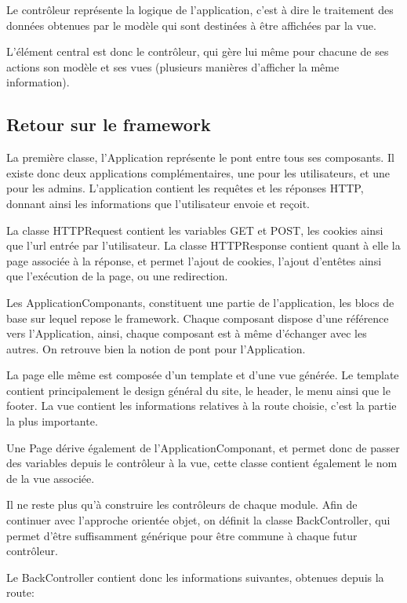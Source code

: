 Le contrôleur représente la logique de l'application, c'est à dire le traitement des données obtenues par le modèle
qui sont destinées à être affichées par la vue.

L'élément central est donc le contrôleur, qui gère lui même pour chacune de ses actions son modèle et ses vues (plusieurs
manières d'afficher la même information).

        \subsection{Retour sur le framework}

La première classe, l'Application représente le pont entre tous ses composants. Il existe donc deux applications complémentaires, une pour les utilisateurs, et une pour les admins.
L'application contient les requêtes et les réponses HTTP, donnant ainsi les informations que l'utilisateur envoie et reçoit.

La classe HTTPRequest contient les variables GET et POST, les cookies ainsi que l'url entrée par l'utilisateur.
La classe HTTPResponse contient quant à elle la page associée à la réponse, et permet l'ajout de cookies, l'ajout d'entêtes
ainsi que l'exécution de la page, ou une redirection.

Les ApplicationComponants, constituent une partie de l'application, les blocs de base sur lequel repose le framework.
Chaque composant dispose d'une référence vers l'Application, ainsi, chaque composant est à même d'échanger avec les autres.
On retrouve bien la notion de pont pour l'Application.

La page elle même est composée d'un template et d'une vue générée.
Le template contient principalement le design général du site, le header, le menu ainsi que le footer.
La vue contient les informations relatives à la route choisie, c'est la partie la plus importante.

Une Page dérive également de l'ApplicationComponant, et permet donc de passer des variables depuis le contrôleur à la vue,
cette classe contient également le nom de la vue associée.

Il ne reste plus qu'à construire les contrôleurs de chaque module.
Afin de continuer avec l'approche orientée objet, on définit la classe BackController, qui permet d'être
suffisamment générique pour être commune à chaque futur contrôleur.

Le BackController contient donc les informations suivantes, obtenues depuis la route:

